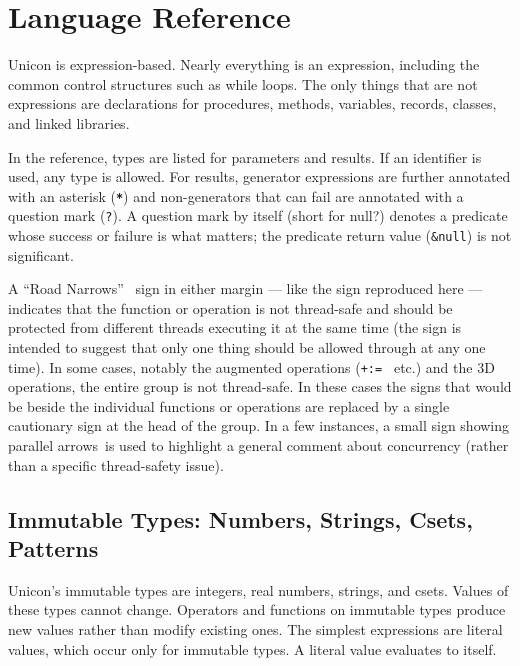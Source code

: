 \chapter{Language Reference}	%

Unicon is expression-based. Nearly everything is an expression,
including the common control structures such
as while loops. The only things that are not expressions are
declarations for procedures, methods, variables, records, classes, and
linked libraries.

In the reference, types are listed for parameters and results. If an
identifier is used, any type is allowed. For results,
generator expressions are further annotated with an
asterisk (\texttt{\textbf{*}}) and non-generators that can
fail are annotated with a question mark
(\texttt{?}). A question mark by itself (short for \textsf{null?})
denotes a predicate whose success or failure is what matters; the
predicate return value (\texttt{\&null}) is not significant.

A ``Road Narrows''  \WarningNotThreadSafe\ sign in either margin
--- like the sign reproduced here --- indicates that the function
or operation is not thread-safe and should be protected from different
threads executing it at the same time (the sign is intended to suggest
that only one thing should be allowed through at any one time). In some cases,
notably the augmented operations (\texttt{+:= } etc.) and the 3D operations,
the entire group is not thread-safe. In these cases the signs that would be
beside the individual functions or operations are replaced by a single cautionary
sign at the head of the group.
In a few instances, a small sign showing parallel arrows\ConcurrencyIssue\ is used to highlight a general
comment about concurrency (rather than a specific thread-safety issue).

\section{Immutable Types: Numbers, Strings, Csets, Patterns}

Unicon's immutable types are integers, real numbers,
strings, and csets. Values of these types cannot change. Operators and
functions on immutable types produce new values rather than modify
existing ones. The simplest expressions are literal values, which occur
only for immutable types. A literal value evaluates to itself.

